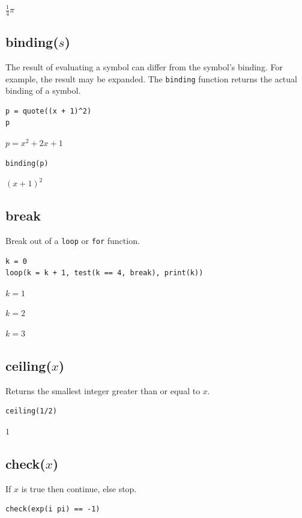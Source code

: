 \documentclass[12pt]{article}
\begin{document}
$\tfrac{1}{4}\pi$

\subsection*{binding($s$)}

The result of evaluating a symbol can differ from the symbol's binding.
For example, the result may be expanded.
The {\tt binding} function returns the actual binding of a symbol.

{\color{blue}
\begin{verbatim}
p = quote((x + 1)^2)
p
\end{verbatim}
}

$p=x^2+2x+1$

{\color{blue}
\begin{verbatim}
binding(p)
\end{verbatim}
}

$(x+1)^2$

\subsection*{break}

Break out of a \verb$loop$ or \verb$for$ function.

{\color{blue}
\begin{verbatim}
k = 0
loop(k = k + 1, test(k == 4, break), print(k))
\end{verbatim}
}

$k=1$

$k=2$

$k=3$

\subsection*{ceiling($x$)}

Returns the smallest integer greater than or equal to $x$.

{\color{blue}
\begin{verbatim}
ceiling(1/2)
\end{verbatim}
}

$1$

\subsection*{check($x$)}

If $x$ is true then continue, else stop.

{\color{blue}
\begin{verbatim}
check(exp(i pi) == -1)
\end{verbatim}
}
\end{document}
